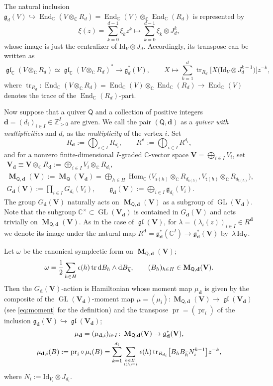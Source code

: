 \documentclass[pdftex]{sigma}
\numberwithin{equation}{section}
\theoremstyle{definition}
\newcommand{\Z}{\mathbb{Z}} %
\newcommand{\C}{\mathbb{C}} %
\newcommand{\GL}{\operatorname{GL}} %
\newcommand{\gl}{\operatorname{\mathfrak{gl}}}
\newcommand{\g}{\mathfrak{g}} %
\newcommand{\End}{\operatorname{End}}
\newcommand{\Hom}{\operatorname{Hom}}
\newcommand{\tr}{\operatorname{tr}}
\newcommand{\unit}{\mathrm{Id}}
\newcommand{\prj}{\operatorname{pr}}
\newcommand{\bM}{\operatorname{\mathbf{M}}}
\newcommand{\bV}{\mathbf{V}}
\newcommand{\ov}{\overline}
\newcommand{\ved}{\mathbf{d}}
\newcommand{\sumfrac}[2]{\genfrac{}{}{0pt}{2}{#1}{#2}}
\newcommand{\vin}{\mathsf{t}} %
\newcommand{\vout}{\mathsf{s}} %
\newcommand{\QQ}{\mathsf{Q}} %
\newcommand{\rd}{\mathop{\mathrm{d}\!}\mathstrut}
\begin{document}
The natural inclusion
$\g_d(V) \hookrightarrow \End_\C(V \otimes_\C R_d)
=\End_\C(V) \otimes_\C \End_\C(R_d)$ is represented by
\[
\xi(z)=\sum_{k=0}^{d-1} \xi_k z^k \longmapsto
\sum_{k=0}^{d-1} \xi_k \otimes J_d^k,
\]
whose image is just the centralizer of $\unit_V \otimes J_d$.
Accordingly, its transpose
can be written as
\[
\gl_\C(V \otimes_\C R_d) \simeq \gl_\C (V \otimes_\C R_d)^*
\to \g_d^*(V),\qquad
X \mapsto \sum_{k=1}^d \tr_{R_d}
\bigl[ X \big(\unit_V \otimes J_d^{k-1}\big) \bigr]  z^{-k},
\]
where $\tr_{R_d} \colon \End_\C(V \otimes_\C R_d)
= \End_\C(V)\otimes_\C \End_\C(R_d) \to \End_\C(V)$
denotes the trace of the $\End_\C(R_d)$-part.

Now suppose that a quiver $\QQ$
and a collection of positive integers $\ved =(d_i)_{i \in I} \in \Z_{>0}^I$
are given.
We call the pair $(\QQ,\ved)$ as a {\em quiver with multiplicities}
and $d_i$ as the {\em multiplicity} of the vertex $i$.
Set
\[
R_\ved := \bigoplus_{i \in I} R_{d_i}, \qquad
R^\ved := \bigoplus_{i \in I} R^{d_i},
\]
and for a nonzero f\/inite-dimensional $I$-graded $\C$-vector space
$\bV=\bigoplus_{i \in I} V_i$,
set
\begin{gather*}
\bV_\ved \equiv \bV \otimes_\C R_\ved
:= \bigoplus_{i \in I} V_i \otimes_\C R_{d_i}, \\
\bM_{\QQ,\ved}(\bV) := \bM_\QQ(\bV_\ved)
= \bigoplus_{h\in H}
\Hom_\C \big(V_{\vout(h)} \otimes_\C R_{d_{\vout(h)}},
V_{\vin(h)} \otimes_\C R_{d_{\vin(h)}}\big), \\
G_\ved(\bV) := \prod_{i \in I} G_{d_i}(V_i), \qquad
\g_\ved(\bV):= \bigoplus_{i \in I} \g_{d_i}(V_i).
\end{gather*}
The group $G_\ved(\bV)$ naturally acts on $\bM_{\QQ,\ved}(\bV)$ as a
subgroup of $\GL(\bV_\ved)$.
Note that the subgroup
$\C^\times \subset \GL(\bV_\ved)$
is contained in $G_\ved(\bV)$ and acts trivially on $\bM_{\QQ,\ved}(\bV)$.
As in the case of $\gl(\bV)$,
for $\lambda =(\lambda_i(z))_{i \in I} \in R^\ved$
we denote its image under the natural map
$R^\ved=\g^*_\ved(\C^I) \to \g^*_\ved(\bV)$
by~$\lambda\,\unit_\bV$.

Let $\omega$ be the canonical symplectic form on $\bM_{\QQ,\ved}(\bV)$;
\[
\omega = \frac12 \sum_{h \in H} \epsilon(h) \tr \rd B_h \wedge \rd B_{\ov{h}},
\qquad (B_h)_{h \in H} \in \bM_{\QQ,\ved}(\bV).
\]
Then the $G_\ved(\bV)$-action is Hamiltonian
whose moment map $\mu_\ved$ is given by the composite of
the $\GL(\bV_\ved)$-moment map
$\mu =(\mu_i) \colon \bM_{\QQ,\ved}(\bV) \to \gl(\bV_\ved)$
(see \eqref{eq:moment} for the def\/inition)
and the transpose
$\prj=(\prj_i)$ of the inclusion
$\g_\ved(\bV) \hookrightarrow \gl(\bV_\ved)$;
\begin{gather*}
\mu_\ved  =(\mu_{\ved,i})_{i \in I}
\colon \bM_{\QQ,\ved}(\bV) \to \g_\ved^*(\bV), \\
\mu_{\ved,i}(B)  := \prj_i \circ\, \mu_i (B)
= \sum_{k=1}^{d_i} \sum_{\sumfrac{h \in H:}{\vin(h)=i}}
\epsilon(h) \tr_{R_{d_i}}
\bigl[ B_h B_{\ov{h}} N_i^{k-1} \bigr]  z^{-k},
\end{gather*}
where $N_i := \unit_{V_i} \otimes J_{d_i}$.
\end{document}
